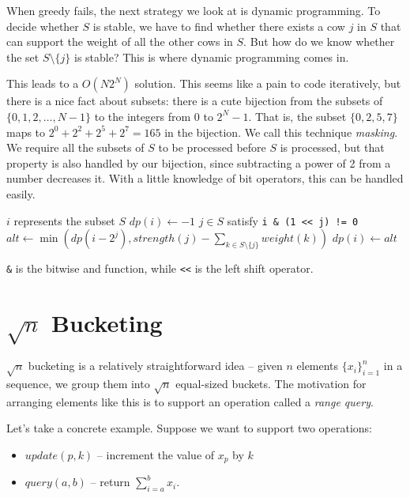 When greedy fails, the next strategy we look at is dynamic programming. To decide whether $S$ is stable, we have to find whether there exists a cow $j$ in $S$ that can support the weight of all the other cows in $S$. But how do we know whether the set $S \setminus \{j\}$ is stable? This is where dynamic programming comes in.

This leads to a $O(N 2^N)$ solution. This seems like a pain to code iteratively, but there is a nice fact about subsets: there is a cute bijection from the subsets of $\{0,1,2, \ldots, N-1\}$ to the integers from 0 to $2^N - 1$. That is, the subset $\{0,2,5,7\}$ maps to $2^0 + 2^2 + 2^5 + 2^7 = 165$ in the bijection. We call this technique \textit{masking}. We require all the subsets of $S$ to be processed before $S$ is processed, but that property is also handled by our bijection, since subtracting a power of 2 from a number decreases it. With a little knowledge of bit operators, this can be handled easily.

\noindent \begin{minipage}{\textwidth}
\begin{algorithmic}
	\Comment $i$ represents the subset $S$
	\State $dp(i) \gets -1$
		\Comment $j \in S$ satisfy \texttt{i \& (1 << j) != 0}
		\State $alt \gets \min(dp(i-2^j), strength(j) - \sum_{k \in S \setminus \{j\}} weight(k))$
			\State $dp(i) \gets alt$
		\EndIf
	\EndFor
\EndFor
\end{algorithmic}
\end{minipage}

\texttt{\&} is the bitwise and function, while \texttt{<<} is the left shift operator.

\section{$\sqrt{n}$ Bucketing}

$\sqrt{n}$ bucketing is a relatively straightforward idea -- given $n$ elements $\{x_i\}_{i=1}^n$ in a sequence, we group them into $\sqrt{n}$ equal-sized buckets. The motivation for arranging elements like this is to support an operation called a \textit{range query}.

Let's take a concrete example. Suppose we want to support two operations:

\begin{itemize}
\item
$update(p, k)$ -- increment the value of $x_p$ by $k$

\item
$query(a, b)$ -- return $\sum_{i=a}^b x_i$.
\end{itemize}

